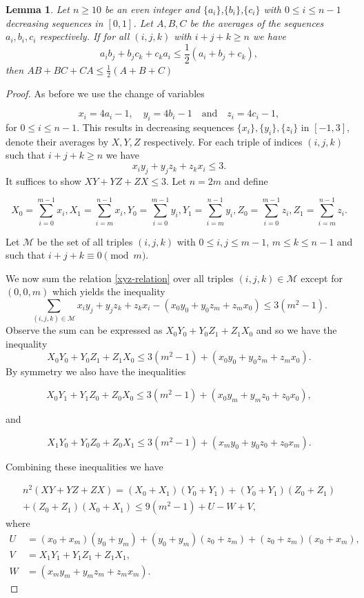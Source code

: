 \documentclass[a4paper,11pt,twoside]{amsart}
\newtheorem{lemma}[theorem]{Lemma}
\theoremstyle{definition}
\numberwithin{equation}{section}
\begin{document}
\begin{lemma}\label{asymmetric-lemma}
Let $n \geq 10$ be an even integer and $\{a_i\}$,$\{b_i\}$,$\{c_i\}$ with $0 \leq i \leq n-1$ decreasing sequences in $[0,1]$.  Let $A,B,C$ be the averages of the sequences $a_i,b_i,c_i$ respectively. If for all $(i,j,k)$ with $i+j + k \geq n $ we have $$a_ib_j + b_jc_k + c_ka_i \leq \frac{1}{2}(a_i + b_j + c_k),$$ then $AB + BC + CA \leq \frac{1}{2}(A+B+C)$
\end{lemma}

\begin{proof}
As before we use the change of variables

\[
x_i = 4a_i - 1, \quad y_i = 4b_i - 1 \quad \textrm{and} \quad z_i = 4c_i - 1,
\]
 for $0 \leq i \leq n-1.$ This results in decreasing sequences $\{x_i\}, \{y_i\},\{z_i\}$ in $[-1,3]$, denote their averages by $X,Y,Z$ respectively. For each triple of indices $(i,j,k)$ such that $i + j + k \geq n$ we have \begin{equation}
    x_iy_j + y_jz_k + z_kx_i \leq 3. \label{xyz-relation}
\end{equation} It suffices to show $XY + YZ + ZX \leq 3.$ Let $n = 2m$ and define 

\[
X_0 = \sum_{i=0}^{m-1}x_i, X_1 = \sum_{i=m}^{n-1}x_i , Y_0 = \sum_{i=0}^{m-1}y_i, Y_1 = \sum_{i=m}^{n-1}y_i, Z_0 = \sum_{i=0}^{m-1}z_i, Z_1 = \sum_{i=m}^{n-1}z_i.
\]

Let $\mathcal{M}$ be the set of all triples $(i,j,k)$ with $0 \leq i,j \leq m-1$, $m \leq k \leq n-1$ and such that $i + j + k \equiv 0 \pmod{m}.$

 We now sum the relation \eqref{xyz-relation} over all triples $(i,j,k) \in \mathcal{M}$ except for $(0,0,m)$ which yields the inequality $$\sum_{(i,j,k) \in \mathcal{M}}x_iy_j + y_jz_k + z_kx_i - (x_0y_0 + y_0z_m + z_mx_0) \leq 3(m^2-1).$$ Observe the sum can be expressed as $X_0Y_0 + Y_0Z_1 + Z_1X_0$ and so we have the inequality $$X_0Y_0 + Y_0Z_1 + Z_1X_0 \leq 3(m^2-1) + (x_0y_0 + y_0z_m + z_mx_0).$$ By symmetry we also have the inequalities 
 
 $$X_0Y_1 + Y_1Z_0 + Z_0X_0 \leq 3(m^2-1) + (x_0y_m + y_mz_0 + z_0x_0),$$

 and

 $$X_1Y_0 + Y_0Z_0 + Z_0X_1 \leq 3(m^2-1) + (x_my_0 + y_0z_0 + z_0x_m).$$

Combining these inequalities we have


\begin{multline*}
n^2(XY + YZ + ZX) = (X_0+X_1)(Y_0 +Y_1) + (Y_0 + Y_1)(Z_0 + Z_1)  \\ + (Z_0 + Z_1)(X_0 + X_1)  \leq 9(m^2-1) + U  - W + V,
\end{multline*}
where
\begin{align*}
    U &= (x_0 + x_m)(y_0 + y_m) + (y_0 + y_m)(z_0 + z_m) + (z_0 + z_m)(x_0 + x_m), \\
    V &= X_1Y_1 + Y_1Z_1 + Z_1X_1, \\
    W &= (x_my_m + y_mz_m + z_mx_m).
\end{align*}


\end{proof}
\end{document}
